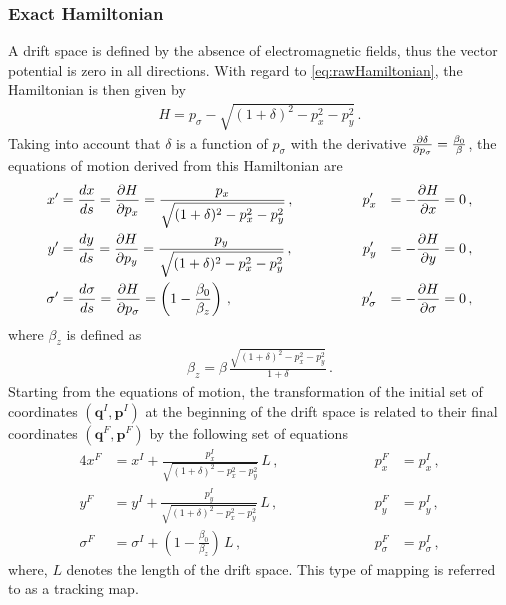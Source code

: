 \subsubsection{Exact Hamiltonian}
A drift space is defined by the absence of electromagnetic fields, thus the vector potential is zero in all directions. With regard to \eqref{eq:rawHamiltonian}, the Hamiltonian is then given by
\begin{align}
H = p_\sigma - \sqrt{(1+\delta)^2 - p_x^2 -p_y^2}  \, . \label{eq:full_H_drift}
\end{align}
Taking into account that $\delta$ is a function of $p_\sigma$ with the derivative $\frac{\partial \delta}{\partial p_\sigma}= \frac{\beta_0}{\beta}$, the equations of motion derived from this Hamiltonian are
\begin{alignat}{4}
x' &= \frac{d x}{d s} = \frac{\partial H}{\partial p_x} = \frac{p_x}{ \sqrt{(1+\delta)^2 - p_x^2 -p_y^2} } \, ,\quad \quad \quad \quad &p_x' &&= -\frac{\partial H}{\partial x} = 0 \, , \\
y' &= \frac{d y}{d s} = \frac{\partial H}{\partial p_y} = \frac{p_y}{\sqrt{(1+\delta)^2 - p_x^2 -p_y^2}}\, ,  \quad \quad &p_y' &&= -\frac{\partial H}{\partial y} = 0 \, , \\
\sigma' &=  \frac{d \sigma}{d s} = \frac{\partial H}{\partial p_\sigma} = \left( 1 - \frac{\beta_0}{\beta_z}  \right) \, ,    &p_\sigma' &&= -\frac{\partial H}{\partial \sigma} = 0 \, , 
\end{alignat}
where $\beta_z$ is defined as 
\begin{align}
\beta_z = \beta \, \frac{\sqrt{(1+\delta)^2 - p_x^2 -p_y^2}}{1+\delta}\,.
\end{align}
%
Starting from the equations of motion, the transformation of the initial set of coordinates $(\mathbf{q}^I,\mathbf{p}^I)$ at the beginning of the drift space is related to their final coordinates $(\mathbf{q}^F,\mathbf{p}^F)$ by the following set of equations
%
\begin{alignat}{4}
x^F & = x^I + \frac{p_x^I}{ \sqrt{(1+\delta)^2 - p_x^2 -p_y^2} } \,  L \, , \quad \quad \quad \quad \quad \quad &p_x^F &= p_x^I \, , \\
y^F & = y^I + \frac{p_y^I}{ \sqrt{(1+\delta)^2 - p_x^2 -p_y^2} } \,  L \, ,\quad \quad &p_y^F &= p_y^I \, , \\
\sigma^F & = \sigma^I + \left(1 - \frac{\beta_0}{\beta_z}\right) \,  L\, , \quad \quad &p_\sigma^F &= p_\sigma^I \, ,
\end{alignat}
%
where, $L$ denotes the length of the drift space. This type of mapping is referred to as a tracking map. 
